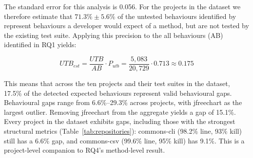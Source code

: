 % 
The standard error for this analysis is 0.056.
For the projects in the dataset we therefore estimate that $71.3\%\pm5.6\%$ of the untested behaviours identified by \toolname{} represent behaviours a developer would expect of a method, but are not tested by the existing test suite.
Applying this precision to the all behaviours (AB) identified in RQ1 yields:

\[
{UTB_{est}} = \frac{UTB}{AB} \cdot {P_{utb} = \frac{5,\!083}{20,\!729} \cdot {0.713} \approx 0.175} 
\]

This means that across the ten projects and their test suites in the dataset, 17.5\% of the detected expected behaviours represent valid behavioural gaps.
Behavioural gaps range from 6.6\%--29.3\% across projects, with jfreechart as the largest outlier. Removing jfreechart from the aggregate yields a gap of 15.1\%. 
Every project in the dataset exhibits gaps, including those with the strongest structural metrics (Table~\ref{tab:repositories}): commons-cli (98.2\% line, 93\% kill) still has a 6.6\% gap, and commons-csv (99.6\% line, 95\% kill) has 9.1\%. This is a project-level companion to RQ4's method-level result. %

